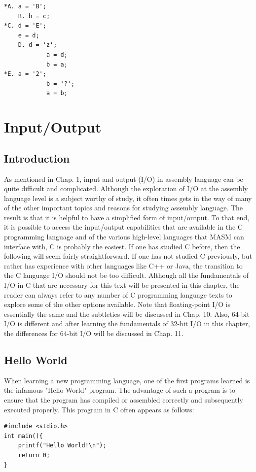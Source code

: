 \documentclass[10pt]{book}
\begin{document}
\begin{verbatim}
*A. a = 'B';
    B. b = c;
*C. d = 'E';
    e = d;
    D. d = 'z';
            a = d;
            b = a;
*E. a = '2';
            b = '?';
            a = b;
\end{verbatim}

\section{Input/Output}
\subsection{Introduction}
As mentioned in Chap. 1, input and output (I/O) in assembly language can be quite difficult and complicated. Although the exploration of I/O at the assembly language level is a subject worthy of study, it often times gets in the way of many of the other important topics and reasons for studying assembly language. The result is that it is helpful to have a simplified form of input/output. To that end, it is possible to access the input/output capabilities that are available in the C programming language and of the various high-level languages that MASM can interface with, C is probably the easiest. If one has studied C before, then the following will seem fairly straightforward. If one has not studied C previously, but rather has experience with other languages like C++ or Java, the transition to the C language I/O should not be too difficult. Although all the fundamentals of I/O in C that are necessary for this text will be presented in this chapter, the reader can always refer to any number of C programming language texts to explore some of the other options available. Note that floating-point I/O is essentially the same and the subtleties will be discussed in Chap. 10. Also, 64-bit I/O is different and after learning the fundamentals of 32-bit I/O in this chapter, the differences for 64-bit I/O will be discussed in Chap. 11.

\subsection{Hello World}
When learning a new programming language, one of the first programs learned is the infamous "Hello World" program. The advantage of such a program is to ensure that the program has compiled or assembled correctly and subsequently executed properly. This program in C often appears as follows:

\begin{verbatim}
#include <stdio.h>
int main(){
    printf("Hello World!\n");
    return 0;
}
\end{verbatim}
\end{document}
